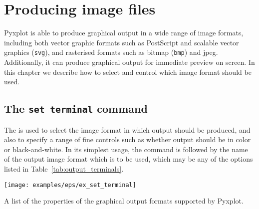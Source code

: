 %
%
%
%
%



\chapter{Producing image files}
\label{ch:image_formats}

Pyxplot is able to produce graphical output in a wide range of image formats,
including both vector graphic formats such as PostScript and scalable vector
graphics ({\tt svg}), and rasterised formats such as bitmap ({\tt bmp}) and
jpeg. Additionally, it can produce graphical output for immediate preview on
screen. In this chapter we describe how to select and control which image
format should be used.

\section{The {\tt set terminal} command}
\label{sec:set_terminal}

The  is used to select the image format in which output
should be produced, and also to specify a range of fine controls such as
whether output should be in color or black-and-white. In its simplest usage,
the command is followed by the name of the output image format which is to be
used, which may be any of the options listed in Table~\ref{tab:output_terminals}.

\begin{table}
\centerline{\texttt{[image: examples/eps/ex\_set\_terminal]}}
\caption{A list of the properties of the graphical output formats supported by Pyxplot.}
\label{tab:output_terminals}
\end{table}

